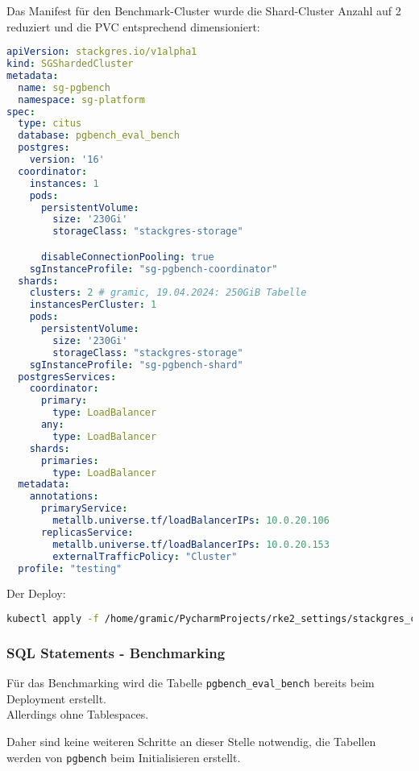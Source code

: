 Das Manifest für den Benchmark-Cluster wurde die Shard-Cluster Anzahl auf 2 reduziert und die PVC entsprechend dimensioniert:
\lstset{style=gra_codestyle}
\begin{lstlisting}[language=yaml, caption=StackGres-Citus - Benchmarking - SGShardedCluster 250GiB,captionpos=b,label={lst:SGShardedCluster_pgbench.yaml-250gib},breaklines=true]
apiVersion: stackgres.io/v1alpha1
kind: SGShardedCluster
metadata:
  name: sg-pgbench
  namespace: sg-platform
spec:
  type: citus
  database: pgbench_eval_bench
  postgres:
    version: '16'
  coordinator:
    instances: 1
    pods:
      persistentVolume:
        size: '230Gi'
        storageClass: "stackgres-storage"

      disableConnectionPooling: true
    sgInstanceProfile: "sg-pgbench-coordinator"
  shards:
    clusters: 2 # gramic, 19.04.2024: 250GiB Tabelle
    instancesPerCluster: 1
    pods:
      persistentVolume:
        size: '230Gi'
        storageClass: "stackgres-storage"
    sgInstanceProfile: "sg-pgbench-shard"
  postgresServices:
    coordinator:
      primary:
        type: LoadBalancer
      any:
        type: LoadBalancer
    shards:
      primaries:
        type: LoadBalancer
  metadata:
    annotations:
      primaryService:
        metallb.universe.tf/loadBalancerIPs: 10.0.20.106
      replicasService:
        metallb.universe.tf/loadBalancerIPs: 10.0.20.153
        externalTrafficPolicy: "Cluster"
  profile: "testing"
\end{lstlisting}

Der Deploy:
\lstset{style=gra_codestyle}
\begin{lstlisting}[language=bash, caption=StackGres-Citus - Benchmark - Cluster Deploy 250GiB,captionpos=b,label={lst:stackgres_citus-benchmnarking-deploy-cluster-250gib},breaklines=true]
kubectl apply -f /home/gramic/PycharmProjects/rke2_settings/stackgres_citus/stackgres_citus/SGShardedCluster_pgbench.yaml
\end{lstlisting}

\subsubsection{SQL Statements - Benchmarking}
\label{subsubsec:stackgres_citus_benchmarking_sql}
Für das Benchmarking wird die Tabelle \texttt{pgbench\_eval\_bench} bereits beim Deployment erstellt.\\
Allerdings ohne Tablespaces.

Daher sind keine weiteren Schritte an dieser Stelle notwendig, die Tabellen werden von \texttt{pgbench} beim Initialisieren erstellt.
